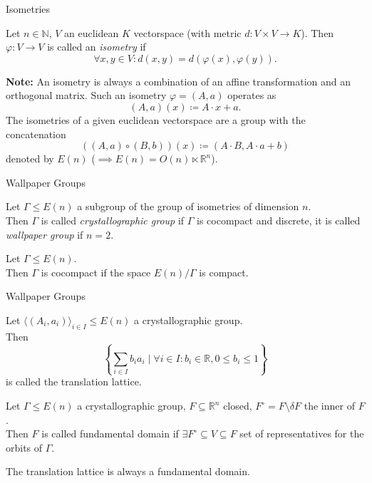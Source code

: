 \documentclass{beamer}
\numberwithin{equation}{aufgabe}
\newcommand\R{\mathbb R}
\newcommand\N{\mathbb N}
\renewcommand{\phi}{\varphi}
\begin{document}
\begin{frame}{Isometries}
    \begin{definition}
        Let $n \in \N$, $V$ an euclidean $K$ vectorspace (with metric $d: V \times V \to K$).
        Then $\phi: V \to V$ is called an \emph{isometry} if \pause
        $$
            \forall x, y \in V : d(x, y) = d(\phi(x), \phi(y)).
        $$
    \end{definition}
    \pause
    \textbf{Note:} An isometry is always a combination of an affine transformation and an orthogonal matrix. Such an isometry $\phi = (A, a)$ operates as 
    $$
        (A, a)(x) \coloneqq A \cdot x + a.
    $$
    \pause
    The isometries of a given euclidean vectorspace are a group with the concatenation 
    $$
        \left( (A, a) \circ (B, b) \right) (x) \coloneqq (A \cdot B, A\cdot a + b)
    $$
    denoted by $E(n)$ ($ \implies E(n) = O(n) \ltimes \R^n$).
\end{frame}
\begin{frame}{Wallpaper Groups}
    \begin{definition}
        Let $\Gamma \leq E(n)$ a subgroup of the group of isometries of dimension $n$.\\ \pause
        Then $\Gamma$ is called \emph{crystallographic group} if $\Gamma$ is cocompact and discrete, \pause it is called \emph{wallpaper group} if $n=2$.
    \end{definition}
    \pause
    \begin{definition}
        Let $\Gamma \leq E(n)$. \\ \pause
        Then $\Gamma$ is cocompact if the space $E(n) / \Gamma$ is compact.
    \end{definition}
\end{frame}

\begin{frame}{Wallpaper Groups}
    \begin{definition}
        Let $\langle (A_i, a_i) \rangle_{i \in I} \leq E(n)$ a crystallographic group. \\ \pause
        Then 
        $$
            \left\{  \sum_{i \in I} b_i a_i \mid \forall i \in I : b_i \in \R, 0 \leq b_i \leq 1 \right\}
        $$
        is called the translation lattice.
    \end{definition}
    \pause
    \begin{definition}
        Let $\Gamma \leq E(n)$ a crystallographic group, $F \subseteq \R^n$ closed, $F^\circ = F \setminus \delta F$ the inner of $F$. \\ \pause
        Then $F$ is called fundamental domain if $\exists F^\circ \subseteq V \subseteq F$ set of representatives for the orbits of $\Gamma$.
    \end{definition}
    \pause
    The translation lattice is always a fundamental domain.
\end{frame}
\end{document}

